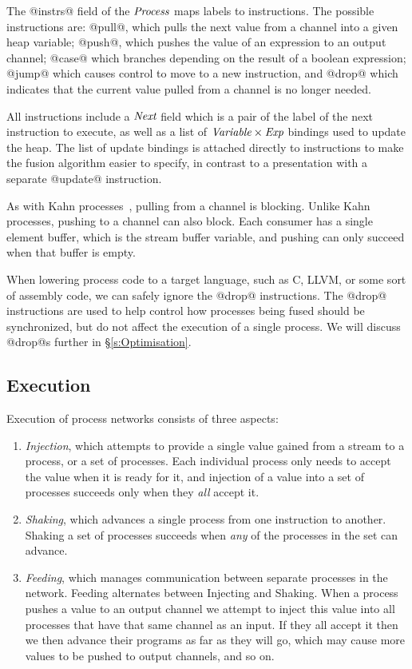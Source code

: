 The @instrs@ field of the $\textit{Process}$ maps labels to instructions. The possible instructions are: @pull@, which pulls the next value from a channel into a given heap variable; @push@, which pushes the value of an expression to an output channel; @case@ which branches depending on the result of a boolean expression; @jump@ which causes control to move to a new instruction, and @drop@ which indicates that the current value pulled from a channel is no longer needed. 

All instructions include a $\textit{Next}$ field which is a pair of the label of the next instruction to execute, as well as a list of $\textit{Variable} \times \textit{Exp}$ bindings used to update the heap. The list of update bindings is attached directly to instructions to make the fusion algorithm easier to specify, in contrast to a presentation with a separate @update@ instruction. 

As with Kahn processes~\cite{kahn1976coroutines}, pulling from a channel is blocking. Unlike Kahn processes, pushing to a channel can also block. Each consumer has a single element buffer, which is the stream buffer variable, and pushing can only succeed when that buffer is empty.

When lowering process code to a target language, such as C, LLVM, or some sort of assembly code, we can safely ignore the @drop@ instructions. The @drop@ instructions are used to help control how processes being fused should be synchronized, but do not affect the execution of a single process. We will discuss @drop@s further in \S\ref{s:Optimisation}.


\subsection{Execution}
\label{s:Process:Eval}


Execution of process networks consists of three aspects:

\begin{enumerate}
\item \emph{Injection}, which attempts to provide a single value gained from a stream to a process, or a set of processes. Each individual process only needs to accept the value when it is ready for it, and injection of a value into a set of processes succeeds only when they \emph{all} accept it.

\item \emph{Shaking}, which advances a single process from one instruction to another. Shaking a set of processes succeeds when \emph{any} of the processes in the set can advance.

\item \emph{Feeding}, which manages communication between separate processes in the network. Feeding alternates between Injecting and Shaking. When a process pushes a value to an output channel we attempt to inject this value into all processes that have that same channel as an input. If they all accept it then we then advance their programs as far as they will go, which may cause more values to be pushed to output channels, and so on.

\end{enumerate}

